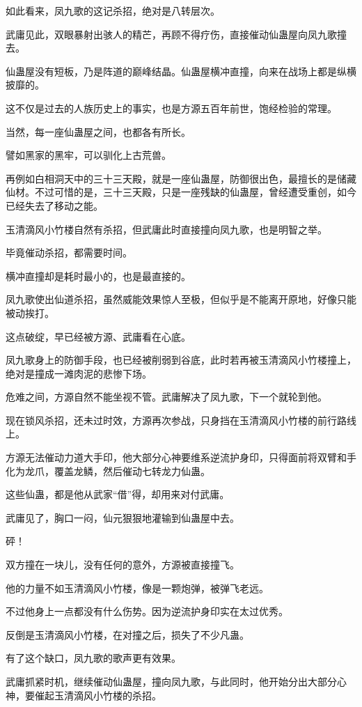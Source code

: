 \begin{this_body}
如此看来，凤九歌的这记杀招，绝对是八转层次。

武庸见此，双眼暴射出骇人的精芒，再顾不得疗伤，直接催动仙蛊屋向凤九歌撞去。

仙蛊屋没有短板，乃是阵道的巅峰结晶。仙蛊屋横冲直撞，向来在战场上都是纵横披靡的。

这不仅是过去的人族历史上的事实，也是方源五百年前世，饱经检验的常理。

当然，每一座仙蛊屋之间，也都各有所长。

譬如黑家的黑牢，可以驯化上古荒兽。

再例如白相洞天中的三十三天殿，就是一座仙蛊屋，防御很出色，最擅长的是储藏仙材。不过可惜的是，三十三天殿，只是一座残缺的仙蛊屋，曾经遭受重创，如今已经失去了移动之能。

玉清滴风小竹楼自然有杀招，但武庸此时直接撞向凤九歌，也是明智之举。

毕竟催动杀招，都需要时间。

横冲直撞却是耗时最小的，也是最直接的。

凤九歌使出仙道杀招，虽然威能效果惊人至极，但似乎是不能离开原地，好像只能被动挨打。

这点破绽，早已经被方源、武庸看在心底。

凤九歌身上的防御手段，也已经被削弱到谷底，此时若再被玉清滴风小竹楼撞上，绝对是撞成一滩肉泥的悲惨下场。

危难之间，方源自然不能坐视不管。武庸解决了凤九歌，下一个就轮到他。

现在锁风杀招，还未过时效，方源再次参战，只身挡在玉清滴风小竹楼的前行路线上。

方源无法催动力道大手印，他大部分心神要维系逆流护身印，只得面前将双臂和手化为龙爪，覆盖龙鳞，然后催动七转龙力仙蛊。

这些仙蛊，都是他从武家“借”得，却用来对付武庸。

武庸见了，胸口一闷，仙元狠狠地灌输到仙蛊屋中去。

砰！

双方撞在一块儿，没有任何的意外，方源被直接撞飞。

他的力量不如玉清滴风小竹楼，像是一颗炮弹，被弹飞老远。

不过他身上一点都没有什么伤势。因为逆流护身印实在太过优秀。

反倒是玉清滴风小竹楼，在对撞之后，损失了不少凡蛊。

有了这个缺口，凤九歌的歌声更有效果。

武庸抓紧时机，继续催动仙蛊屋，撞向凤九歌，与此同时，他开始分出大部分心神，要催起玉清滴风小竹楼的杀招。


\end{this_body}
